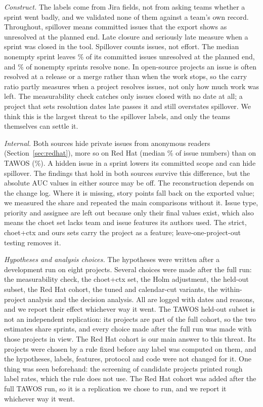 \emph{Construct.} The labels come from Jira fields, not from asking teams whether a sprint went badly, and we validated none of them against a team's own record. Throughout, spillover means committed issues that the export shows as unresolved at the planned end. Late closure and seriously late measure when a sprint was closed in the tool. Spillover counts issues, not effort. The median nonempty sprint leaves \CarryMedPct\% of its committed issues unresolved at the planned end, and \CleanNothingPct\% of nonempty sprints resolve none. In open-source projects an issue is often resolved at a release or a merge rather than when the work stops, so the carry ratio partly measures when a project resolves issues, not only how much work was left. The measurability check catches only issues closed with no date at all; a project that sets resolution dates late passes it and still overstates spillover. We think this is the largest threat to the spillover labels, and only the teams themselves can settle it.

\emph{Internal.} Both sources hide private issues from anonymous readers (Section~\ref{sec:redhat}), more so on Red Hat (median \GapRhMed\% of issue numbers) than on TAWOS (\GapTwMed\%). A hidden issue in a sprint lowers its committed scope and can hide spillover. The findings that hold in both sources survive this difference, but the absolute AUC values in either source may be off. The reconstruction depends on the change log. Where it is missing, story points fall back on the exported value; we measured the share and repeated the main comparisons without it. Issue type, priority and assignee are left out because only their final values exist, which also means the choet set lacks team and issue features its authors used. The strict, choet+ctx and ours sets carry the project as a feature; leave-one-project-out testing removes it.

\emph{Hypotheses and analysis choices.} The hypotheses were written after a development run on eight projects. Several choices were made after the full run: the measurability check, the choet+ctx set, the Holm adjustment, the held-out subset, the Red Hat cohort, the tuned and calendar-cut variants, the within-project analysis and the decision analysis. All are logged with dates and reasons, and we report their effect whichever way it went. The TAWOS held-out subset is not an independent replication: its \ConfProj{} projects are part of the full cohort, so the two estimates share \ConfSprints{} sprints, and every choice made after the full run was made with those projects in view. The Red Hat cohort is our main answer to this threat. Its projects were chosen by a rule fixed before any label was computed on them, and the hypotheses, labels, features, protocol and code were not changed for it. One thing was seen beforehand: the screening of candidate projects printed rough label rates, which the rule does not use. The Red Hat cohort was added after the full TAWOS run, so it is a replication we chose to run, and we report it whichever way it went.

